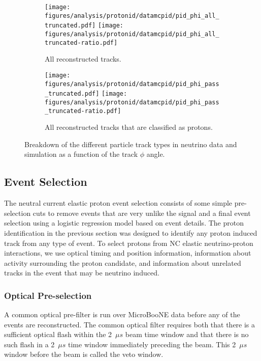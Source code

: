     \begin{figure}[h]
      \centering
      \begin{subfigure}[t]{2.5in}
        \texttt{[image: figures/analysis/protonid/datamcpid/pid\_phi\_all\_truncated.pdf]}
        \texttt{[image: figures/analysis/protonid/datamcpid/pid\_phi\_all\_truncated-ratio.pdf]}
        \caption{All reconstructed tracks.}
      \end{subfigure}
      \hspace{2pt}
      \begin{subfigure}[t]{2.5in}
        \texttt{[image: figures/analysis/protonid/datamcpid/pid\_phi\_pass\_truncated.pdf]}
        \texttt{[image: figures/analysis/protonid/datamcpid/pid\_phi\_pass\_truncated-ratio.pdf]}
        \caption{All reconstructed tracks that are classified as protons.}
      \end{subfigure}
      \caption{Breakdown of the different particle track types in neutrino data
      and simulation as a function of the track $\phi$ angle.}
      \label{fig:pidphi}
    \end{figure}

    \FloatBarrier


\subsection{Event Selection}\label{sec:selection}
  The neutral current elastic proton event selection consists of some simple
  pre-selection cuts to remove events that are very unlike the signal and a
  final event selection using a logistic regression model based on event
  details. The proton identification in the previous section was designed to
  identify any proton induced track from any type of event. To select protons
  from NC elastic neutrino-proton interactions, we use optical timing and
  position information, information about activity surrounding the proton
  candidate, and information about unrelated tracks in the event that may be
  neutrino induced.

  \subsubsection{Optical Pre-selection}\label{sec:optpresel}
    A common optical pre-filter is run over MicroBooNE data before any of the
    events are reconstructed. The common optical filter requires both that
    there is a sufficient optical flash within the 2~$\mu s$ beam time window
    and that there is no such flash in a 2~$\mu s$ time window immediately
    preceding the beam. This 2~$\mu s$ window before the beam is called the
    veto window.

